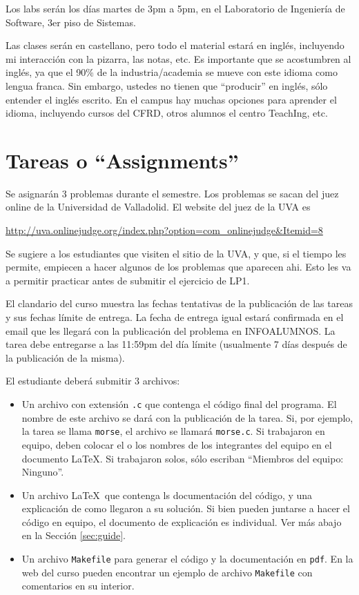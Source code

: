 \documentclass[11pt]{article}
\begin{document}
Los labs ser\'an los d\'ias martes de 3pm a 5pm, en el Laboratorio de
Ingenier\'ia de Software, 3er piso de Sistemas.

Las clases ser\'an en castellano, pero todo el material estar\'a en
ingl\'es, incluyendo mi interacci\'on con la pizarra, las notas,
etc. Es importante que se acostumbren al ingl\'es, ya que el 90\% de
la industria/academia se mueve con este idioma como lengua franca. Sin
embargo, ustedes no tienen que ``producir'' en ingl\'es, s\'olo
entender el ingl\'es escrito. En el campus hay muchas opciones para
aprender el idioma, incluyendo cursos del CFRD, otros alumnos el
centro TeachIng, etc.

\section{Tareas o ``Assignments''}
\label{sec:assg}

Se asignar\'an 3 problemas durante el semestre. Los problemas se sacan
del juez online de la Universidad de Valladolid. El website del juez
de la UVA es

\begin{center}
  \url{http://uva.onlinejudge.org/index.php?option=com_onlinejudge&Itemid=8}
\end{center}

Se sugiere a los estudiantes que visiten el sitio de la UVA, y que, si
el tiempo les permite, empiecen a hacer algunos de los problemas que
aparecen ahi. Esto les va a permitir practicar antes de submitir el
ejercicio de LP1.

El clandario del curso muestra las fechas tentativas de la
publicaci\'on de las tareas y sus fechas l\'imite de entrega. La fecha
de entrega igual estar\'a confirmada en el email que les llegar\'a con
la publicaci\'on del problema en INFOALUMNOS. La tarea debe entregarse
a las 11:59pm del d\'ia l\'imite (usualmente 7 d\'ias despu\'es de la
publicaci\'on de la misma).

El estudiante deber\'a submitir 3 archivos:

\begin{itemize}
\item Un archivo con extensi\'on \verb+.c+ que contenga el c\'odigo
  final del programa. El nombre de este archivo se dar\'a con la
  publicaci\'on de la tarea. Si, por ejemplo, la tarea se llama
  \verb+morse+, el archivo se llamar\'a \verb+morse.c+. Si trabajaron
  en equipo, deben colocar el o los nombres de los integrantes del
  equipo en el documento \LaTeX. Si trabajaron solos, s\'olo escriban
  ``Miembros del equipo: Ninguno''.
\item Un archivo \LaTeX\ que contenga ls documentaci\'on del c\'odigo,
  y una explicaci\'on de como llegaron a su soluci\'on. Si bien pueden
  juntarse a hacer el c\'odigo en equipo, el documento de
  explicaci\'on es individual. Ver m\'as abajo en la Secci\'on
  \ref{sec:guide}.
\item Un archivo \verb+Makefile+ para generar el c\'odigo y la
  documentaci\'on en \verb+pdf+. En la web del curso pueden encontrar
  un ejemplo de archivo \verb+Makefile+ con comentarios en su
  interior.
\end{itemize}
\end{document}
